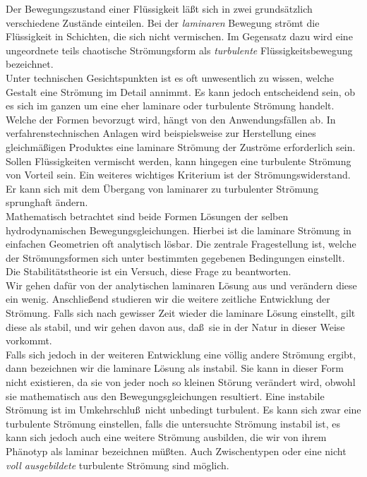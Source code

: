 \documentclass[10pt,a5paper,oneside,draft]{book}
\numberwithin{equation}{chapter}
\begin{document}
Der Bewegungszustand einer Fl\"ussigkeit l\"a\ss t sich in zwei grunds\"atzlich verschiedene Zust\"ande einteilen.
Bei der \textit{laminaren} Bewegung str\"omt die Fl\"ussigkeit in Schichten, die sich nicht vermischen.
Im Gegensatz dazu wird eine ungeordnete teils chaotische Str\"omungsform als \textit{turbulente} Fl\"ussigkeitsbewegung bezeichnet.\\
Unter technischen Gesichtspunkten ist es oft unwesentlich zu wissen, welche Gestalt eine Str\"omung im Detail annimmt.
Es kann jedoch entscheidend sein, ob es sich im ganzen um eine eher laminare oder turbulente Str\"omung handelt.\\
Welche der Formen bevorzugt wird, h\"angt von den Anwendungsf\"allen ab.
In verfahrenstechnischen Anlagen wird beispielsweise zur Herstellung eines gleichm\"a\ss igen Produktes eine laminare Str\"omung der Zustr\"ome erforderlich sein.
Sollen Fl\"ussigkeiten vermischt werden, kann hingegen eine turbulente Str\"omung von Vorteil sein.
Ein weiteres wichtiges Kriterium ist der Str\"omungswiderstand.
Er kann sich mit dem \"Ubergang von laminarer zu turbulenter Str\"omung sprunghaft \"andern.\\
Mathematisch betrachtet sind beide Formen L\"osungen der selben hydrodynamischen Bewegungsgleichungen.
Hierbei ist die laminare Str\"omung in einfachen Geometrien oft analytisch l\"osbar.
Die zentrale Fragestellung ist, welche der Str\"omungsformen sich unter bestimmten gegebenen Bedingungen einstellt.
Die Stabilit\"atstheorie ist ein Versuch, diese Frage zu beantworten.\\
Wir gehen daf\"ur von der analytischen laminaren L\"osung aus und ver\"andern diese ein wenig.
Anschlie\ss end studieren wir die weitere zeitliche Entwicklung der Str\"omung.
Falls sich nach gewisser Zeit wieder die laminare L\"osung einstellt, gilt diese als stabil, und wir gehen davon aus, da\ss\ sie in der Natur in dieser Weise vorkommt.\\
Falls sich jedoch in der weiteren Entwicklung eine v\"ollig andere Str\"omung ergibt, dann bezeichnen wir die laminare L\"osung als instabil.
Sie kann in dieser Form nicht existieren, da sie von jeder noch so kleinen St\"orung ver\"andert wird, obwohl sie mathematisch aus den Bewegungsgleichungen resultiert.
Eine instabile Str\"omung ist im Umkehrschlu\ss\ nicht unbedingt turbulent.
Es kann sich zwar eine turbulente Str\"omung einstellen, falls die untersuchte Str\"omung instabil ist, es kann sich jedoch auch eine weitere Str\"omung ausbilden, die wir von ihrem Ph\"anotyp als laminar bezeichnen m\"u\ss ten.
Auch Zwischentypen oder eine nicht \textit{voll ausgebildete} turbulente Str\"omung sind m\"oglich.\\
\end{document}
